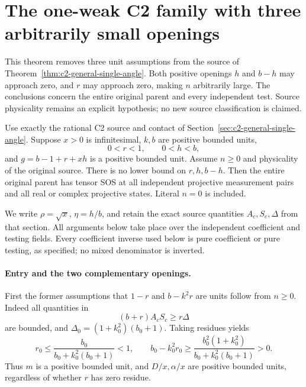 \section{The one-weak C2 family with three arbitrarily small openings}
\label{sec:c2-three-openings}

This theorem removes three unit assumptions from the source of
Theorem~\ref{thm:c2-general-single-angle}.  Both positive openings $h$
and $b-h$ may approach zero, and $r$ may approach zero, making $n$
arbitrarily large.  The conclusions concern the entire original parent
and every independent test.  Source physicality remains an explicit
hypothesis; no new source classification is claimed.

\begin{theorem}
\label{thm:c2-three-openings}
Use exactly the rational C2 source and contact of
Section~\ref{sec:c2-general-single-angle}.  Suppose $x>0$ is
infinitesimal, $k,b$ are positive bounded units,
\[
             0<r<1,\qquad 0<h<b,
\]
and $g=b-1+r+xh$ is a positive bounded unit.  Assume $n\geq0$
and physicality of the original source.  There is no lower bound on
$r,h,b-h$.  Then the entire original parent has tensor SOS at all
independent projective measurement pairs and all real or complex
projective states.  Literal $n=0$ is included.
\end{theorem}

We write $\rho=\sqrt x$, $\eta=h/b$, and retain the exact source
quantities $A_c,S_c,\Delta$ from that section.  All arguments below
take place over the independent coefficient and testing fields.
Every coefficient inverse used below is pure coefficient or pure
testing, as specified; no mixed denominator is inverted.

\paragraph{Entry and the two complementary openings.}
First the former assumptions that $1-r$ and $b-k^2r$ are units follow
from $n\geq0$.  Indeed all quantities in
\[
                 (b+r)A_cS_c\geq r\Delta
\]
are bounded, and $\Delta_0=(1+k_0^2)(b_0+1)$.  Taking residues yields
\[
 r_0\leq\frac{b_0}{b_0+k_0^2(b_0+1)}<1,
 \qquad
 b_0-k_0^2r_0\geq
 \frac{b_0^2(1+k_0^2)}{b_0+k_0^2(b_0+1)}>0.
\]
Thus $m$ is a positive bounded unit, and $D/x,\alpha/x$ are positive
bounded units, regardless of whether $r$ has zero residue.

